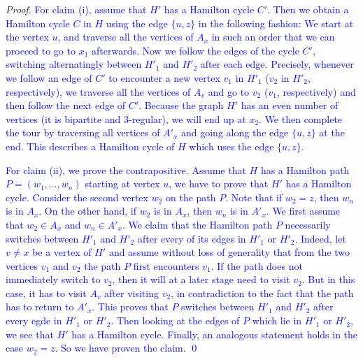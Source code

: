 \documentclass[runningheads]{llncs}
\newcommand{\set}[1]{\{ #1 \}}
\newcommand{\lasse}[1]{\textcolor{blue}{#1}}
\begin{document}
\begin{proof}
\lasse{
For claim (i), assume that $H'$ has a Hamilton cycle $C'$. Then we obtain a Hamilton cycle $C$ in $H$ using the edge $\set{u,z}$ in the following fashion: We start at the vertex $u$, and traverse all the vertices of $A_x$ in such an order that we can proceed to go to $x_1$ afterwards. Now we follow the edges of the cycle $C'$, switching alternatingly between $H'_1$ and $H'_2$ after each edge. Precisely, whenever we follow an edge of $C'$ to encounter a new vertex $v_1$ in $H'_1$ ($v_2$ in $H'_2$, respectively), we traverse all the vertices of $A_v$ and go to $v_2$ ($v_1$, respectively) and then follow the next edge of $C'$. Because the graph $H'$ has an even number of vertices (it is bipartite and 3-regular), we will end up at $x_2$. We then complete the tour by traversing all vertices of $A'_x$ and going along the edge $\set{u,z}$ at the end. This describes a Hamilton cycle of $H$ which uses the edge $\set{u,z}$.
}

\lasse{
For claim (ii), we prove the contrapositive. Assume that $H$ has a Hamilton path $P = (w_1,\dots,w_n)$ starting at vertex $u$, we have to prove that $H'$ has a Hamilton cycle. Consider the second vertex $w_2$ on the path $P$. Note that if $w_2 = z$, then $w_n$ is in $A_x$. On the other hand, if $w_2$ is in $A_x$, then $w_n$ is in $A'_x$. We first assume that $w_2 \in A_x$ and $w_n \in A'_x$.
We claim that the Hamilton path $P$ necessarily switches between $H'_1$ and $H'_2$ after every of its edges in $H'_1$ or $H'_2$. Indeed, let $v \neq x$ be a vertex of $H'$ and assume without loss of generality that from the two vertices $v_1$ and $v_2$ the path $P$ first encounters $v_1$. If the path does not immediately switch to $v_2$, then it will at a later stage need to visit $v_2$. But in this case, it has to visit $A_v$ after visiting $v_2$, in contradiction to the fact that the path has to return to $A'_x$. This proves that $P$ switches between $H'_1$ and $H'_2$ after every egde in $H'_1$ or $H'_2$. Then looking at the edges of $P$ which lie in $H'_1$ or $H'_2$, we see that $H'$ has a Hamilton cycle. Finally, an analogous statement holds in the case $w_2 = z$. So we have proven the claim. \qed
}
\end{proof}


\end{document}

